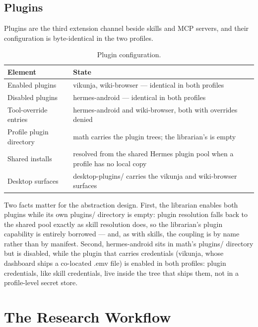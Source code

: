\documentclass[10pt]{article}
\newcommand{\mono}[1]{{\ttfamily\small #1}}
\begin{document}
\subsection*{Plugins}

Plugins are the third extension channel beside skills and MCP servers, and their configuration is
byte-identical in the two profiles.

\begin{table}[htbp]
\centering\small
\caption{Plugin configuration.}
\label{tab:plugins}
\renewcommand{\arraystretch}{1.05}
\begin{tabularx}{\textwidth}{@{}l X@{}}
\toprule
\textbf{Element} & \textbf{State} \\
\midrule
Enabled plugins & \mono{vikunja}, \mono{wiki-browser} --- identical in both profiles \\
Disabled plugins & \mono{hermes-android} --- identical in both profiles \\
Tool-override entries & \mono{hermes-android} and \mono{wiki-browser}, both with overrides denied \\
Profile plugin directory & math carries the plugin trees; the librarian's is empty \\
Shared installs & resolved from the shared Hermes plugin pool when a profile has no local copy \\
Desktop surfaces & \mono{desktop-plugins/} carries the \mono{vikunja} and \mono{wiki-browser} surfaces \\
\bottomrule
\end{tabularx}
\end{table}

Two facts matter for the abstraction design. First, the librarian enables both plugins while its
own \mono{plugins/} directory is empty: plugin resolution falls back to the shared pool exactly as
skill resolution does, so the librarian's plugin capability is entirely borrowed --- and, as with
skills, the coupling is by name rather than by manifest. Second, \mono{hermes-android} sits in math's
\mono{plugins/} directory but is disabled, while the plugin that carries credentials (\mono{vikunja}, whose dashboard ships a
co-located \mono{.emv} file) is enabled in both profiles: plugin credentials, like skill
credentials, live inside the tree that ships them, not in a profile-level secret store.

\section{The Research Workflow}\label{sec:workflow}
\end{document}
